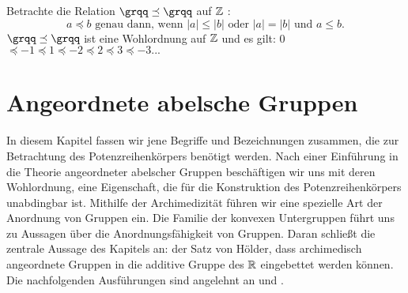 %

%
%
\begin{bsp}
Betrachte die Relation $\grqq\preceq \grqq $ auf $\mathbb{Z}$ :  
\[a \preceq b \text{ genau dann, wenn } |a| \le |b| \text{ oder }  |a| = |b| \text{ und } a \leq  b.\]
 $\grqq\preceq \grqq $ ist eine Wohlordnung auf $\mathbb{Z}$ und es gilt: 0$  \preceq -1 \preceq 1 \preceq -2 \preceq 2 \preceq 3 \preceq -3 ... $ 
\end{bsp}
%

%
 
\chapter{Angeordnete abelsche Gruppen}\label{chap2} %
In diesem Kapitel fassen wir jene Begriffe und Bezeichnungen zusammen, die zur Betrachtung des Potenzreihenkörpers benötigt werden. Nach einer Einführung in die Theorie angeordneter abelscher Gruppen beschäftigen wir uns mit deren Wohlordnung, eine Eigenschaft, die für die Konstruktion des Potenzreihenkörpers unabdingbar ist. Mithilfe der Archimedizität führen wir eine spezielle Art der Anordnung von Gruppen ein. Die Familie der konvexen Untergruppen führt uns zu Aussagen über die Anordnungsfähigkeit von Gruppen. Daran schließt die zentrale Aussage des Kapitels an: der Satz von Hölder, dass archimedisch angeordnete Gruppen in die additive Gruppe des $\mathbb{R}$ eingebettet werden können. \\
Die nachfolgenden Ausführungen sind angelehnt an \cite[S. 21 - 28]{fuchs66} und \cite[S. 1 -  4]{priesscrampe83}.
%
%

